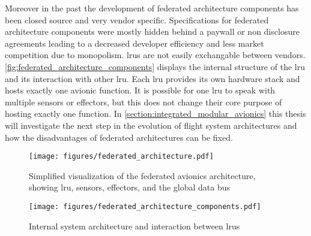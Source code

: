 \documentclass[titlepage]{report}
\begin{document}
Moreover in the past the development of federated architecture components has been closed source and very vendor specific. Specifications for
federated architecture components were mostly hidden behind a paywall or non disclosure agreements leading to a decreased developer efficiency
and less market competition due to monopolism. \glspl{lru} are not easily exchangable between vendors. \autoref{fig:federated_architecture_components}
displays the internal structure of the \gls{lru} and its interaction with other \gls{lru}. Each \gls{lru} provides its own hardware stack and hosts
exactly one avionic function. It is possible for one \gls{lru} to speak with multiple sensors or effectors, but this does not change their core
purpose of hosting exactly one function. In \autoref{section:integrated_modular_avionics} this thesis will investigate the next
step in the evolution of flight system architectures and how the disadvantages of federated architectures can be fixed.

\begin{figure}
    \centering
    \texttt{[image: figures/federated\_architecture.pdf]}
    \caption{Simplified visualization of the federated avionics architecture, showing \gls{lru}, sensors, effectors, and the global data bus}\label{fig:federated_architecture}
\end{figure}
\begin{figure}
    \centering
    \texttt{[image: figures/federated\_architecture\_components.pdf]}
    \caption{Internal system architecture and interaction between \glspl{lru}}\label{fig:federated_architecture_components}
\end{figure}
\end{document}
